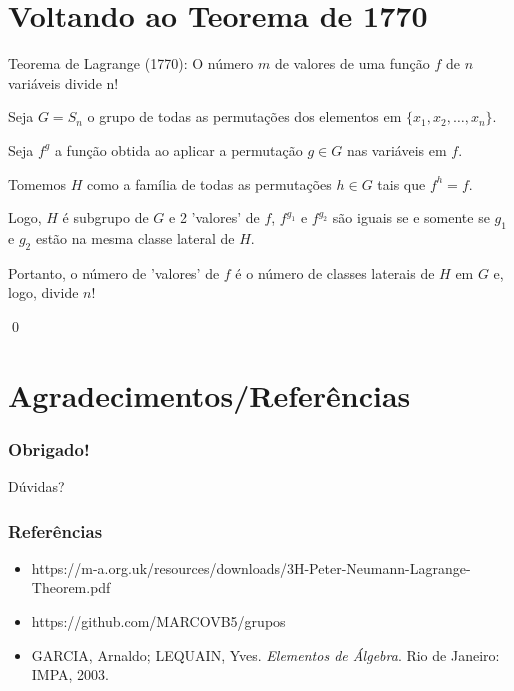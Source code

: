\documentclass{beamer}
\begin{document}
\section{Voltando ao Teorema de 1770}

\begin{frame}

{\color{blue} Teorema de Lagrange (1770):} O número $m$ de valores de uma função $f$ de $n$ variáveis divide n!
\vspace{0.7cm}

Seja $G = S_n$ o grupo de todas as permutações dos elementos em $\{x_1, x_2, \ldots, x_n\}$.

Seja $f^g$ a função obtida ao aplicar a permutação $g\in G$ nas variáveis em $f$.

Tomemos $H$ como a família de todas as permutações $h\in G$ tais que $f^h = f$.

Logo, $H$ é subgrupo de $G$ e 2 'valores' de $f$, $f^{g_1}$ e $f^{g_2}$ são iguais se e somente se $g_1$ e $g_2$ estão na mesma classe lateral de $H$.

Portanto, o número de 'valores' de $f$ é o número de classes laterais de $H$ em $G$ e, logo, divide $n!$

\qed 

\end{frame}

\section{Agradecimentos/Referências}

\begin{frame}
\frametitle{Obrigado!}

\begin{center}
\Large
Dúvidas?
\end{center}

\end{frame}

\begin{frame}
\frametitle{Referências}

\begin{itemize}
\item https://m-a.org.uk/resources/downloads/3H-Peter-Neumann-Lagrange-Theorem.pdf
\item https://github.com/MARCOVB5/grupos
\item GARCIA, Arnaldo; LEQUAIN, Yves. \textit{Elementos de Álgebra}. Rio de Janeiro: IMPA, 2003. 
\end{itemize}

\end{frame}
\end{document}
